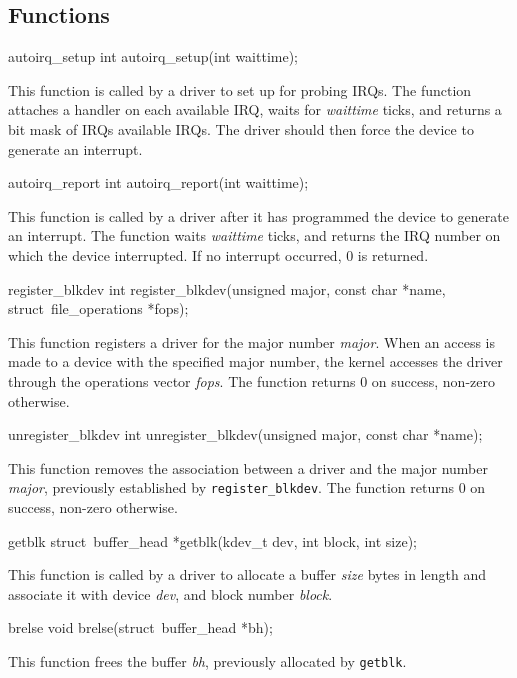 \subsection{Functions}

\begin{icsymlist}
\item[autoirq_setup]
\funcproto int autoirq_setup(int waittime);

This function is called by a driver to set up for probing IRQs.
The function attaches a handler on each available IRQ, waits
for \emph{waittime} ticks, and returns a bit mask of IRQs available
IRQs.  The driver should then force the device to generate an interrupt.

\item[autoirq_report]
\funcproto int autoirq_report(int waittime);

This function is called by a driver after it has programmed the device
to generate an interrupt.  The function waits \emph{waittime} ticks, and
returns the IRQ number on which the device interrupted.  If no
interrupt occurred, 0 is returned.

\item[register_blkdev]
\funcproto int register_blkdev(unsigned major, const char *name,
				struct~file_operations *fops);

This function registers a driver for the major number \emph{major}.
When an access is made to a device with the specified major number,
the kernel accesses the driver through the operations vector \emph{fops}.
The function returns 0 on success, non-zero otherwise.

\item[unregister_blkdev]
\funcproto int unregister_blkdev(unsigned major, const char *name);

This function removes the association between a driver and the major
number \emph{major}, previously established by {\tt register_blkdev}.
The function returns 0 on success, non-zero otherwise.

\item[getblk]
\funcproto struct~buffer_head *getblk(kdev_t dev, int block, int size);

This function is called by a driver to allocate a buffer \emph{size} bytes in
length and associate it with device \emph{dev}, and block number \emph{block}.

\item[brelse]
\funcproto void brelse(struct~buffer_head *bh);

This function frees the buffer \emph{bh}, previously allocated by
{\tt getblk}.


\end{icsymlist}
